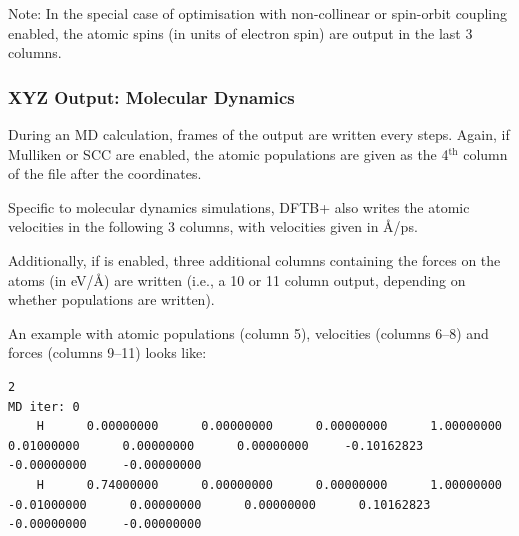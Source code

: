 Note: In the special case of optimisation with non-collinear or
spin-orbit coupling enabled, the atomic spins (in units of electron
spin) are output in the last 3 columns.

\subsubsection{XYZ Output: Molecular Dynamics}

During an MD calculation, frames of the output are written every
 steps. Again, if Mulliken or SCC are enabled,
the atomic populations are given as the 4$^\mathrm{th}$ column of the
file after the coordinates.

Specific to molecular dynamics simulations, DFTB+ also writes the
atomic velocities in the following 3 columns, with velocities given in
\AA{}/ps.

Additionally, if  is enabled, three
additional columns containing the forces on the atoms (in eV/\AA{})
are written (i.e., a 10 or 11 column output, depending on whether
populations are written).

An example with atomic populations (column 5), velocities (columns
6--8) and forces (columns 9--11) looks like:
\begin{tiny}
\begin{verbatim}
2
MD iter: 0
    H      0.00000000      0.00000000      0.00000000      1.00000000      0.01000000      0.00000000      0.00000000     -0.10162823     -0.00000000     -0.00000000
    H      0.74000000      0.00000000      0.00000000      1.00000000     -0.01000000      0.00000000      0.00000000      0.10162823     -0.00000000     -0.00000000
\end{verbatim}
\end{tiny}
